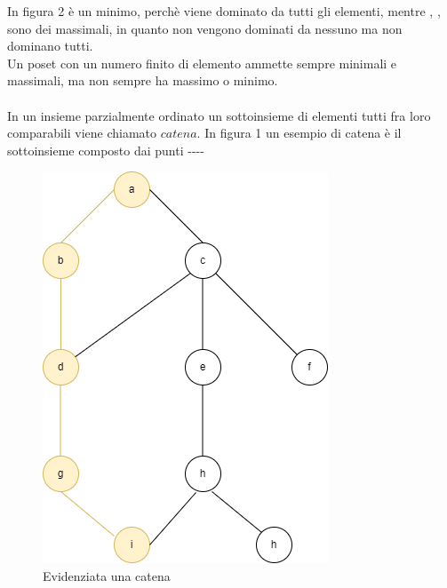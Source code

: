 \documentclass[12pt]{article}
\begin{document}
In figura 2  è un minimo, perchè viene dominato da tutti gli elementi, mentre , ,  sono dei massimali,
in quanto non vengono dominati da nessuno ma non dominano tutti. \\
Un poset con un numero finito di elemento ammette sempre minimali e massimali, ma non sempre ha massimo o minimo. \\
\\ 
In un insieme parzialmente ordinato un sottoinsieme di elementi tutti fra loro comparabili viene chiamato $\textit{catena}$.
In figura 1 un esempio di catena è il sottoinsieme composto dai punti ----\\
\begin{figure}[H]
    \centering
    \includegraphics[scale=.5]{hasse_catena.png}
    \caption{Evidenziata una catena}
\end{figure}
\end{document}
